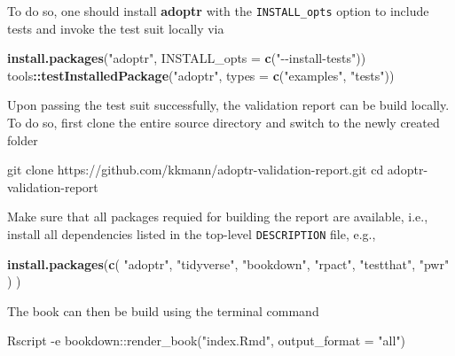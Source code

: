 \documentclass[
]{book}
\newenvironment{Shaded}{\begin{snugshade}}{\end{snugshade}}
\newcommand{\BuiltInTok}[1]{#1}
\newcommand{\DataTypeTok}[1]{\textcolor[rgb]{0.13,0.29,0.53}{#1}}
\newcommand{\ExtensionTok}[1]{#1}
\newcommand{\FunctionTok}[1]{\textcolor[rgb]{0.00,0.00,0.00}{#1}}
\newcommand{\KeywordTok}[1]{\textcolor[rgb]{0.13,0.29,0.53}{\textbf{#1}}}
\newcommand{\NormalTok}[1]{#1}
\newcommand{\OperatorTok}[1]{\textcolor[rgb]{0.81,0.36,0.00}{\textbf{#1}}}
\newcommand{\StringTok}[1]{\textcolor[rgb]{0.31,0.60,0.02}{#1}}
\begin{document}
To do so, one should install \textbf{adoptr} with the \texttt{INSTALL\_opts} option
to include tests and invoke the test suit locally via

\begin{Shaded}
\begin{Highlighting}[]
\KeywordTok{install.packages}\NormalTok{(}\StringTok{"adoptr"}\NormalTok{, }\DataTypeTok{INSTALL\_opts =} \KeywordTok{c}\NormalTok{(}\StringTok{"{-}{-}install{-}tests"}\NormalTok{))}
\NormalTok{tools}\OperatorTok{::}\KeywordTok{testInstalledPackage}\NormalTok{(}\StringTok{"adoptr"}\NormalTok{, }\DataTypeTok{types =} \KeywordTok{c}\NormalTok{(}\StringTok{"examples"}\NormalTok{, }\StringTok{"tests"}\NormalTok{))}
\end{Highlighting}
\end{Shaded}

Upon passing the test suit successfully, the validation report
can be build locally.
To do so, first clone the entire source directory and switch
to the newly created folder

\begin{Shaded}
\begin{Highlighting}[]
\FunctionTok{git}\NormalTok{ clone https://github.com/kkmann/adoptr{-}validation{-}report.git}
\BuiltInTok{cd}\NormalTok{ adoptr{-}validation{-}report}
\end{Highlighting}
\end{Shaded}

Make sure that all packages requied for building the report are
available, i.e., install all dependencies listed in the top-level
\texttt{DESCRIPTION} file, e.g.,

\begin{Shaded}
\begin{Highlighting}[]
\KeywordTok{install.packages}\NormalTok{(}\KeywordTok{c}\NormalTok{(}
    \StringTok{"adoptr"}\NormalTok{, }
    \StringTok{"tidyverse"}\NormalTok{, }
    \StringTok{"bookdown"}\NormalTok{, }
    \StringTok{"rpact"}\NormalTok{, }
    \StringTok{"testthat"}\NormalTok{, }
    \StringTok{"pwr"}\NormalTok{ ) )}
\end{Highlighting}
\end{Shaded}

The book can then be build using the terminal command

\begin{Shaded}
\begin{Highlighting}[]
\ExtensionTok{Rscript}\NormalTok{ {-}e }\StringTok{\textquotesingle{}bookdown::render\_book("index.Rmd", output\_format = "all")\textquotesingle{}}
\end{Highlighting}
\end{Shaded}
\end{document}
